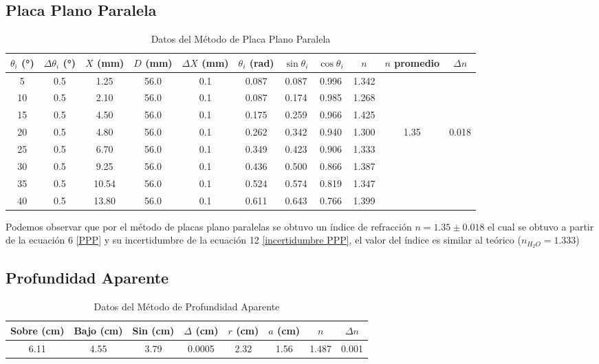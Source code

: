 \documentclass[article,12pt]{elsarticle}
\begin{document}
\subsection*{Placa Plano Paralela}
\begin{table}[h]
    \centering
    \begin{tabular}{|c|c|c|c|c|c|c|c|c|c|c|}
        \hline
        $\theta_i$ (°) & $\Delta\theta_i$ (°) & $X$ (mm) & $D$ (mm) & $\Delta X$ (mm) & $\theta_i$ (rad) & $\sin\theta_i$ & $\cos\theta_i$ & $n$ & $n$ promedio & $\Delta n$ \\
        \hline
        5 & 0.5 & 1.25 & 56.0 & 0.1 & 0.087 & 0.087 & 0.996 & 
 1.342 & & \\
        10 & 0.5 & 2.10 & 56.0 & 0.1 & 0.087 & 0.174 & 0.985 & 1.268 & & \\
        15 & 0.5 & 4.50 & 56.0 & 0.1 & 0.175 & 0.259 & 0.966 & 1.425 & & \\
        20 & 0.5 & 4.80 & 56.0 & 0.1 & 0.262 & 0.342 & 0.940 & 1.300 &1.35 & 0.018\\
        25 & 0.5 & 6.70 & 56.0 & 0.1 & 0.349 & 0.423 & 0.906 & 1.333 & & \\
        30 & 0.5 & 9.25 & 56.0 & 0.1 & 0.436 & 0.500 & 0.866 & 1.387 & & \\
        35 & 0.5 & 10.54 & 56.0 & 0.1 & 0.524 & 0.574 & 0.819 & 1.347 & & \\
        40 & 0.5 & 13.80 & 56.0 & 0.1 & 0.611 & 0.643 & 0.766 & 1.399 & & \\
        \hline
    \end{tabular}
    \caption{Datos del Método de Placa Plano Paralela}
    \label{tab:placa}
\end{table}
Podemos observar que por el método de placas plano paralelas se obtuvo un índice de refracción $n=1.35\pm0.018$ el cual se obtuvo a partir de la ecuación 6 \eqref{PPP} y su incertidumbre de la ecuación 12 \eqref{incertidumbre PPP}, el valor del índice es similar al teórico ($n_{H_2O}=1.333$)

\subsection*{Profundidad Aparente}
\begin{table}[H]
    \centering
    \begin{tabular}{|c|c|c|c|c|c|c|c|}
        \hline
        Sobre (cm) & Bajo (cm) & Sin (cm) & $\Delta$ (cm) & $r$ (cm) & $a$ (cm) & $n$& $\Delta n$ \\
        \hline
        6.11 & 4.55 & 3.79 & 0.0005 & 2.32 & 1.56 & 1.487& 0.001\\

        \hline
    \end{tabular}
    \caption{Datos del Método de Profundidad Aparente}
    \label{tab:profundidad}
\end{table}
\end{document}
